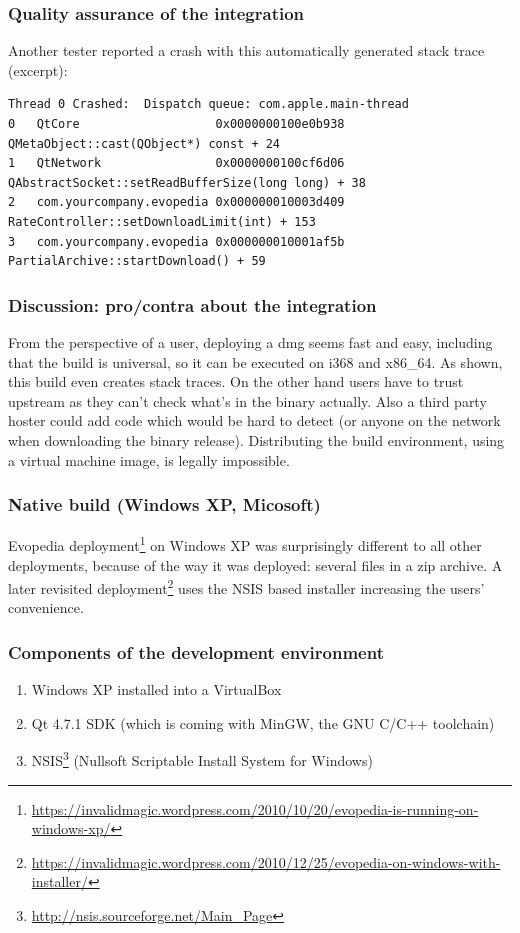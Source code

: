 \documentclass[a4paper,10pt]{article}
\begin{document}
\subsubsection*{Quality assurance of the integration}
Another tester reported a crash with this automatically generated stack trace (excerpt): 
\begin{verbatim}
Thread 0 Crashed:  Dispatch queue: com.apple.main-thread
0   QtCore                   0x0000000100e0b938 QMetaObject::cast(QObject*) const + 24
1   QtNetwork                0x0000000100cf6d06 QAbstractSocket::setReadBufferSize(long long) + 38
2   com.yourcompany.evopedia 0x000000010003d409 RateController::setDownloadLimit(int) + 153
3   com.yourcompany.evopedia 0x000000010001af5b PartialArchive::startDownload() + 59
\end{verbatim}

\subsubsection*{Discussion: pro/contra about the integration}
From the perspective of a user, deploying a dmg seems fast and easy, including that the build is universal, so it can be executed on i368 and x86\_64. As shown, this build even creates stack traces. On the other hand users have to trust upstream as they can't check what's in the binary actually. Also a third party hoster could add code which would be hard to detect (or anyone on the network when downloading the binary release). Distributing the build environment, using a virtual machine image, is legally impossible. 









\newpage
\subsubsection{Native build (Windows XP, Micosoft)}
\label{nativewin}
Evopedia deployment\footnote{\url{https://invalidmagic.wordpress.com/2010/10/20/evopedia-is-running-on-windows-xp/}} on Windows XP was surprisingly different to all other deployments, because of the way it was deployed: several files in a zip archive. A later revisited deployment\footnote{\url{https://invalidmagic.wordpress.com/2010/12/25/evopedia-on-windows-with-installer/}} uses the NSIS based installer increasing the users' convenience.

\subsubsection*{Components of the development environment}
\begin{enumerate}
 \item Windows XP installed into a VirtualBox
 \item Qt 4.7.1 SDK (which is coming with MinGW, the GNU C/C++ toolchain)
 \item NSIS\footnote{\url{http://nsis.sourceforge.net/Main_Page}} (Nullsoft Scriptable Install System for Windows)
\end{enumerate}
\end{document}
